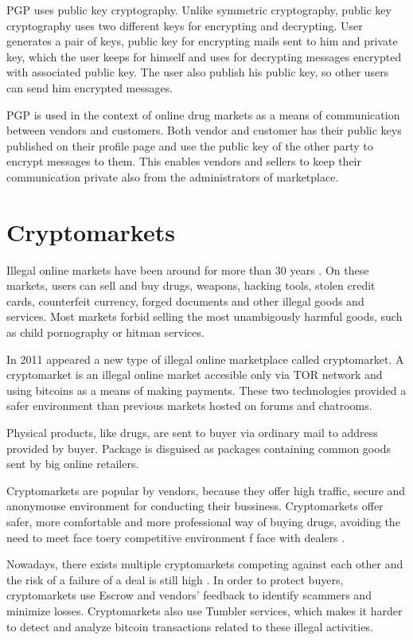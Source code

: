 \documentclass[
  digital, %
  table,   %
  lof,     %
  lot,     %
  oneside
]{fithesis3}
\begin{document}
PGP uses public key cryptography. Unlike symmetric cryptography, public key cryptography
uses two different keys for encrypting and decrypting.
User generates a pair of keys, public key for encrypting mails sent to him and private key, which the user
 keeps for himself and uses for decrypting messages encrypted with associated public key.
 The user also publish his public key, so other users can send him encrypted messages.

PGP is used in the context of online drug markets as a means of communication between vendors and customers.
Both vendor and customer has their public keys published on their profile page and use the public key of the other
party to encrypt messages to them. This enables vendors and sellers to keep their communication private also 
from the administrators of marketplace.

\section{Cryptomarkets}

Illegal online markets have been around for more than 30 years \parencite{motoyama2011analysis}.
On these markets, users can sell and buy drugs, weapons, hacking tools, stolen credit cards,
counterfeit currency, forged documents and other illegal goods and services.
Most markets forbid selling the most unambigously harmful goods, such as child pornography or hitman services.
 
In 2011 appeared a new type of illegal online marketplace called cryptomarket. 
A cryptomarket is an illegal online market accesible only via TOR network and using bitcoins
as a means of making payments. These two technologies provided a safer environment
than previous markets hosted on forums and chatrooms.

Physical products, like drugs, are sent to buyer via ordinary mail to address provided by buyer.
Package is disguised as packages containing common goods sent by big online retailers.
\parencite{paquet2017cryptomarkets}

Cryptomarkets are popular by vendors,
because they offer high traffic, secure and anonymouse environment for conducting their bussiness\parencite {van2014responsible}.
Cryptomarkets offer safer, more comfortable and more professional way of buying drugs, avoiding 
the need to meet face toery competitive environment f face with dealers \parencite{barratt2014use}.

Nowadays, there exists multiple cryptomarkets competing against each other and the risk
of a failure of a deal is still high \parencite{wehinger2011dark}.
In order to protect buyers, cryptomarkets use Escrow and vendors' feedback to identify scammers and minimize losses.
Cryptomarkets also use Tumbler services, which makes it harder to detect and analyze bitcoin transactions
 related to these illegal activities.
\end{document}
